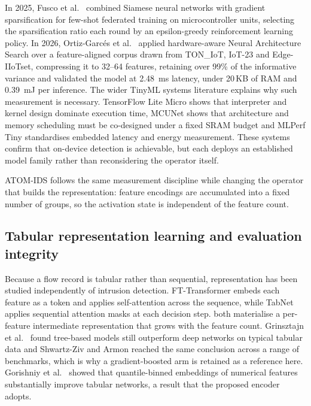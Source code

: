 \documentclass[10pt,letterpaper,twocolumn]{article}
\begin{document}
In 2025, Fusco et al.\ \cite{fusco2025siamese} combined Siamese neural networks
with gradient sparsification for few-shot federated training on microcontroller
units, selecting the sparsification ratio each round by an epsilon-greedy
reinforcement learning policy. In 2026, Ortiz-Garcés et al.\
\cite{ortizgarces2026nas} applied hardware-aware Neural Architecture Search
over a feature-aligned corpus drawn from TON\_IoT, IoT-23 and Edge-IIoTset,
compressing it to 32--64 features, retaining over 99\% of the informative
variance and validated the model at \SI{2.48}{\milli\second} latency, under
20\,KB of RAM and \SI{0.39}{\milli\joule} per inference. The wider TinyML
systems literature explains why such measurement is necessary. TensorFlow Lite
Micro \cite{david2021tflm} shows that interpreter and kernel design dominate
execution time, MCUNet \cite{lin2020mcunet} shows that architecture and memory
scheduling must be co-designed under a fixed SRAM budget and MLPerf Tiny
\cite{banbury2021mlperftiny} standardises embedded latency and energy
measurement. These systems confirm that on-device detection is achievable, but
each deploys an established model family rather than reconsidering the operator
itself.

ATOM-IDS follows the same measurement discipline while changing the operator
that builds the representation: feature encodings are accumulated into a fixed
number of groups, so the activation state is independent of the feature count.

\subsection{Tabular representation learning and evaluation integrity}
\label{sec.related.tabular}

Because a flow record is tabular rather than sequential, representation has
been studied independently of intrusion detection. FT-Transformer
\cite{gorishniy2021revisiting} embeds each feature as a token and applies
self-attention across the sequence, while TabNet \cite{arik2021tabnet} applies
sequential attention masks at each decision step. both materialise a
per-feature intermediate representation that grows with the feature count.
Grinsztajn et al.\ \cite{grinsztajn2022why} found tree-based models still
outperform deep networks on typical tabular data and Shwartz-Ziv and Armon
\cite{shwartzziv2022tabular} reached the same conclusion across a range of
benchmarks, which is why a gradient-boosted arm is retained as a reference
here. Gorishniy et al.\ \cite{gorishniy2022embeddings} showed that
quantile-binned embeddings of numerical features substantially improve tabular
networks, a result that the proposed encoder adopts.
\end{document}
